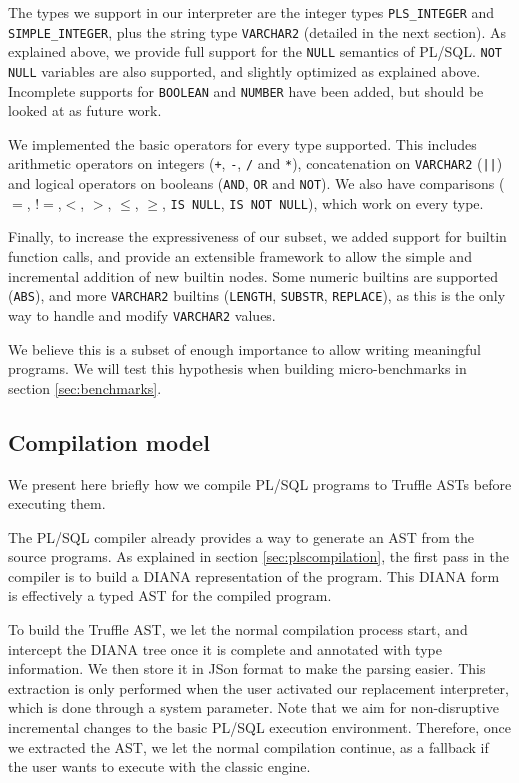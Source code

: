 \documentclass[twoside,11pt,a4paper]{article}
\newcommand{\maybe}[1]{\textit{(maybe ? #1)}}
\newcommand{\pls}[1]{\small\texttt{#1}\normalsize}
\newcommand{\plstype}[1]{\pls{#1}}
\newcommand{\varchar}{\plstype{VARCHAR2}}
\newcommand{\plsi}{\plstype{PLS\_INTEGER}}
\newcommand{\simpleint}{\plstype{SIMPLE\_INTEGER}}
\newcommand{\plsnull}{\pls{NULL}}
\begin{document}
The types we support in our interpreter are the integer types \plsi{} and \simpleint{}, plus the string type \varchar{} (detailed in the next section). As explained above, we provide full support for the \plsnull{} semantics of PL/SQL. \pls{NOT NULL} variables are also supported, and slightly optimized as explained above. Incomplete supports for \pls{BOOLEAN} and \pls{NUMBER} have been added, but should be looked at as future work.

We implemented the basic operators for every type supported. This includes arithmetic operators on integers (\pls{+}, \pls{-}, \pls{/} and \pls{*}), concatenation on \varchar{} (\pls{||}) and logical operators on booleans (\pls{AND}, \pls{OR} and \pls{NOT}). We also have comparisons ($=$, $!=$,$<$, $>$, $\leq$, $\geq$, \pls{IS NULL}, \pls{IS NOT NULL}), which work on every type.

Finally, to increase the expressiveness of our subset, we added support for builtin function calls, and provide an extensible framework to allow the simple and incremental addition of new builtin nodes. Some numeric builtins are supported (\pls{ABS}), and more \varchar{} builtins (\pls{LENGTH}, \pls{SUBSTR}, \pls{REPLACE}), as this is the only way to handle and modify \varchar{} values.

We believe this is a subset of enough importance to allow writing meaningful programs. We will test this hypothesis when building micro-benchmarks in section \ref{sec:benchmarks}.

\subsection{Compilation model}

We present here briefly how we compile PL/SQL programs to Truffle ASTs before executing them.

The PL/SQL compiler already provides a way to generate an AST from the source programs. As explained in section \ref{sec:plscompilation}, the first pass in the compiler is to build a DIANA representation of the program. This DIANA form is effectively a typed AST for the compiled program.

To build the Truffle AST, we let the normal compilation process start, and intercept the DIANA tree once it is complete and annotated with type information. We then store it in JSon format to make the parsing easier. This extraction is only performed when the user activated our replacement interpreter, which is done through a system parameter. Note that we aim for non-disruptive incremental changes to the basic PL/SQL execution environment. Therefore, once we extracted the AST, we let the normal compilation continue, as a fallback if the user wants to execute with the classic engine.
\end{document}
